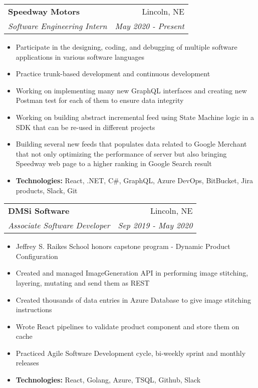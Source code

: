 \documentclass[letterpaper,10pt]{article}
\makeatletter
\newcommand{\resumeSubheading}[4]{
  \vspace{-1pt}\item[]
  \begin{tabular*}{0.98\textwidth}{l@{\extracolsep{\fill}}r}
      \hspace{-10pt}\textbf{#1} & #2 \\
      \hspace{-10pt}\textit{\small#3} & \textit{\small #4} \\
    \end{tabular*}\vspace{-5pt}
}
\newcommand{\resumeItemListStart}{\begin{itemize}}
\newcommand{\resumeItemListEnd}{\end{itemize}\vspace{-5pt}}
\makeatother
\begin{document}
    \resumeSubheading
        {Speedway Motors}{Lincoln, NE}
        {Software Engineering Intern}{May 2020 - Present}
        \resumeItemListStart
            \small
                \item Participate in the designing, coding, and debugging of multiple software applications in various software languages
                \item Practice trunk-based development and continuous development
                \item Working on implementing many new GraphQL interfaces and creating new Postman test for each of them to ensure data integrity
                \item Working on building abstract incremental feed using State Machine logic in a SDK that can be re-used in different projects
                \item Building several new feeds that populates data related to Google Merchant that not only optimizing the performance of server but also bringing Speedway web page to a higher ranking in Google Search result
                \item \textbf{Technologies: } React, .NET, C\#, GraphQL, Azure DevOps, BitBucket, Jira products, Slack, Git
        \resumeItemListEnd
      
    \resumeSubheading
        {DMSi Software}{Lincoln, NE}
        {Associate Software Developer}{Sep 2019 - May 2020}
        \resumeItemListStart
            \small
                \item Jeffrey S. Raikes School honors capstone program - Dynamic Product Configuration
                \item Created and managed ImageGeneration API in performing image stitching, layering, mutating and send them as REST
                \item Created thousands of data entries in Azure Database to give image stitching instructions
                \item Wrote React pipelines to validate product component and store them on cache
                \item Practiced Agile Software Development cycle, bi-weekly sprint and monthly releases
                \item \textbf{Technologies: } React, Golang, Azure, TSQL, Github, Slack 
        \resumeItemListEnd
\end{document}
